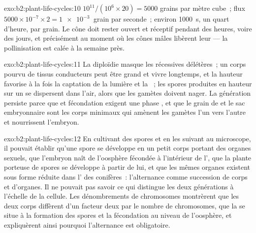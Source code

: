 \begin{solution}{exo:b2:plant-life-cycles:10}
$10^{11}/(10^{6}\times 20) = \num{5000}$ grains par mètre cube~; flux
$5000\times 10^{-7}\times 2 = \qty{1e-3}{}$ grain par seconde~; environ
\qty{1000}{s}, un quart d'heure, par grain. Le cône doit rester ouvert
et réceptif pendant des heures, voire des jours, et précisément au
moment où les cônes mâles libèrent leur  --- la pollinisation est
calée à la semaine près.
\end{solution}

\begin{solution}{exo:b2:plant-life-cycles:11}
La diploïdie masque les  récessives délétères~; un corps
 pourvu de tissus conducteurs peut être grand et vivre
longtemps, et la hauteur favorise à la fois la captation de la lumière
et la ~; les spores produites en hauteur sur un
 se dispersent dans l'air, alors que les gamètes doivent
nager. La génération  persiste parce que  et fécondation
exigent une phase , et que le grain de  et le sac
embryonnaire sont les corps minimaux qui amènent les gamètes l'un vers
l'autre et nourrissent l'embryon.
\end{solution}

\begin{solution}{exo:b2:plant-life-cycles:12}
En cultivant des spores et en les suivant au microscope, il pouvait
établir qu'une spore se développe en un petit corps portant des organes
sexuels, que l'embryon naît de l'oosphère fécondée à l'intérieur de
l', que la plante porteuse de spores se développe à partir de
lui, et que les mêmes organes existent sous forme réduite dans l'
des conifères~: l'alternance comme succession de corps et d'organes. Il
ne pouvait pas savoir ce qui distingue les deux générations à l'échelle
de la cellule. Les dénombrements de chromosomes montrèrent que les deux
corps diffèrent d'un facteur deux par le nombre de chromosomes, que la
 se situe à la formation des spores et la fécondation au niveau de
l'oosphère, et expliquèrent ainsi pourquoi l'alternance est
obligatoire.
\end{solution}

